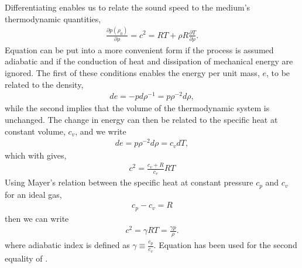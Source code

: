 Differentiating  enables us to relate the sound speed to the medium's thermodynamic quantities,
\begin{align}
  \label{eqn:linear:differential}
    \frac{\partial p(\rho_0)}{\partial \rho} = c^2 = RT + \rho R \frac{\partial T}{\partial \rho}.
\end{align}
Equation  can be put into a more convenient form if the process is assumed adiabatic
and if the conduction of heat and dissipation of mechanical energy are ignored.
The first of these conditions enables the  energy per unit mass, $e$,  to be related to the density,
\begin{align}
  de = -pd\rho^{-1} = p \rho^{-2} d\rho,
\end{align}
while the second implies that the volume of the thermodynamic system is unchanged.
The  change in energy can then be related  to the specific heat at constant volume, $c_v$,  and we write
\begin{align}
  de = p \rho^{-2} d\rho = c_v dT,
\end{align}
which with  gives,
\begin{align}
  \label{eqn:linear:diffential:two}
  c^2 = \frac{c_v + R}{c_v}RT
\end{align}
Using Mayer's relation between the specific heat at constant pressure $c_p$ and $c_v$ for an ideal gas,
\begin{align}
  \label{eqn:Mayer}
  c_p - c_v = R
\end{align}
then we can write
\begin{align}
  \label{eqn:eqnState}
  c^2 = \gamma RT = \frac{\gamma p}{\rho}.
\end{align}
where  adiabatic index is defined as $\gamma \equiv  \frac{c_p}{c_v}$.
Equation  has been used for the second equality of .




